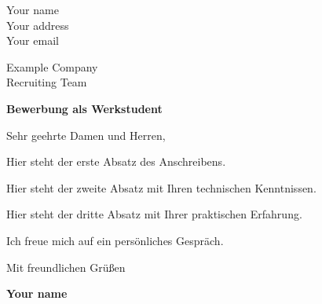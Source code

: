 \documentclass[11pt,a4paper]{article}
\begin{document}
Your name\\
Your address\\
Your email

Example Company\\
Recruiting Team

\vspace{0.5cm}
\large\textbf{Bewerbung als Werkstudent}

Sehr geehrte Damen und Herren,

Hier steht der erste Absatz des Anschreibens.

Hier steht der zweite Absatz mit Ihren technischen Kenntnissen.

Hier steht der dritte Absatz mit Ihrer praktischen Erfahrung.

Ich freue mich auf ein persönliches Gespräch.

\vspace{0.3cm}
Mit freundlichen Grüßen

\vspace{0.6cm}
\textbf{Your name}
\end{document}

